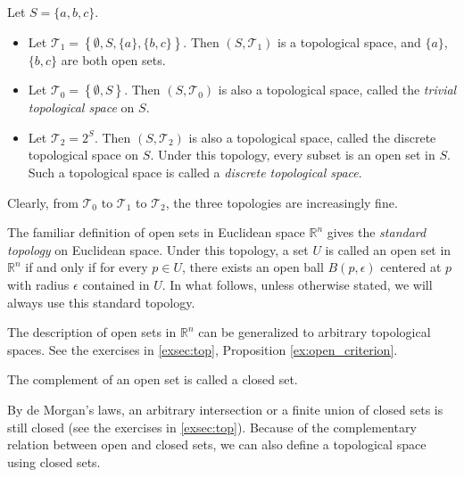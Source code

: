 \begin{example}
	Let $S = \{a,b,c\}$.

	\begin{itemize}
		\item Let $\mathcal{T}_1 = \left\{\emptyset, S, \{a\},
			      \{b,c\}\right\}$. Then $(S,\mathcal{T}_1)$ is a topological space,
		      and $\{a\}$, $\{b,c\}$ are both open sets.
		\item Let $\mathcal{T}_0 = \left\{\emptyset, S\right\}$. Then
		      $(S,\mathcal{T}_0)$ is also a topological space, called the
		      \emph{trivial topological space} on $S$.
		\item Let $\mathcal{T}_2 = 2^S$. Then $(S,\mathcal{T}_2)$ is also a
		      topological space, called the discrete topological space on $S$.
		      Under this topology, every subset is an open set in $S$. Such a
		      topological space is called a \emph{discrete topological space}.
	\end{itemize}
	Clearly, from $\mathcal{T}_0$ to $\mathcal{T}_1$ to $\mathcal{T}_2$, the
	three topologies are increasingly fine.

\end{example}



\begin{example}
	The familiar definition of open sets in Euclidean space $\mathbb{R}^n$
	gives the \emph{standard topology} on Euclidean space. Under this
	topology, a set $U$ is called an open set in $\mathbb{R}^n$ if and only
	if for every $p\in U$, there exists an open ball $B(p,\epsilon)$
	centered at $p$ with radius $\epsilon$ contained in $U$. In what
	follows, unless otherwise stated, we will always use this standard
	topology.
\end{example}

\begin{remark} The description of open sets in $\mathbb{R}^n$ can be
	generalized to arbitrary topological spaces. See the exercises in
	\ref{exsec:top}, Proposition \ref{ex:open_criterion}.
\end{remark}

\begin{definition}
	The complement of an open set is called a closed set.
\end{definition}

\begin{remark}
	By de Morgan's laws, an arbitrary intersection or a finite union of
	closed sets is still closed (see the exercises in \ref{exsec:top}).
	Because of the complementary relation between open and closed sets, we
	can also define a topological space using closed sets.
\end{remark}


